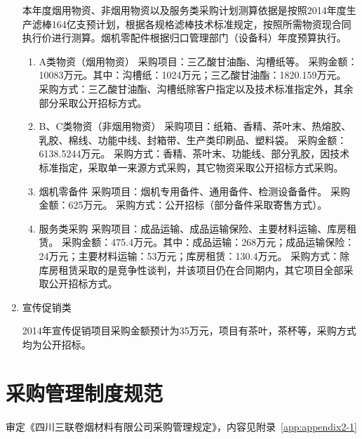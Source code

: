 \begin{enumerate}
本年度烟用物资、非烟用物资以及服务类采购计划测算依据是按照2014年度生产滤棒164亿支预计划，根据各规格滤棒技术标准规定，按照所需物资现合同执行价进行测算。烟机零配件根据归口管理部门（设备科）年度预算执行。
\begin{enumerate}[1、]
  \item A类物资（烟用物资）
采购项目：三乙酸甘油酯、沟槽纸等。
采购金额：10083万元。其中：沟槽纸：1024万元；三乙酸甘油酯：1820.159万元。
采购方式：三乙酸甘油酯、沟槽纸除客户指定以及技术标准指定外，其余部分采取公开招标方式。
  \item B、C类物资（非烟用物资）
采购项目：纸箱、香精、茶叶末、热熔胶、乳胶、棉线、功能中线、封箱带、生产类印刷品、塑料袋。
采购金额：6138.5244万元。
采购方式：香精、茶叶末、功能线、部分乳胶，因技术标准指定，采取单一来源方式采购，其它物资采取公开招标方式采购。
  \item 烟机零备件
采购项目：烟机专用备件、通用备件、检测设备备件。
采购金额：625万元。
采购方式：公开招标（部分备件采取寄售方式）。
  \item 服务类采购
采购项目：成品运输、成品运输保险、主要材料运输、库房租赁。
采购金额：475.4万元。其中：成品运输：268万元；成品运输保险：24万元；主要材料运输：53万元；库房租赁：130.4万元。
采购方式：除库房租赁采取的是竞争性谈判，并该项目仍在合同期内，其它项目全部采取公开招标方式。
\end{enumerate}


 \item 宣传促销类

2014年宣传促销项目采购金额预计为35万元，项目有茶叶，茶杯等，采购方式均为公开招标。
\end{enumerate}

\section{采购管理制度规范}

审定《四川三联卷烟材料有限公司采购管理规定》，内容见附录~\ref{app:appendix2-1}
